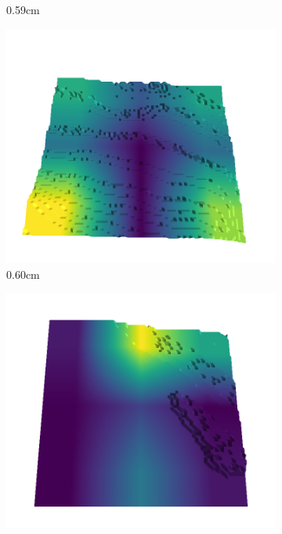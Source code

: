 \documentclass[../document.tex]{subfiles}
\begin{document}
\begin{figure}[H]
\begin{subfigure}[b]{0.192\linewidth}
    \caption{0.59cm}
    \label{fig : quarry-best-12}
    \end{subfigure}
    \begin{subfigure}[b]{0.192\linewidth}
    \includegraphics[width=\linewidth]{../img/5/quarry/best/60-patch-3d-majavi-colormap-130.png}
    \caption{0.60cm}
    \label{fig : quarry-best-13}
    \end{subfigure}
    \begin{subfigure}[b]{0.192\linewidth}
    \includegraphics[width=\linewidth]{../img/5/quarry/best/62-patch-3d-majavi-colormap-140.png}

\end{subfigure}
\end{figure}
\end{document}
